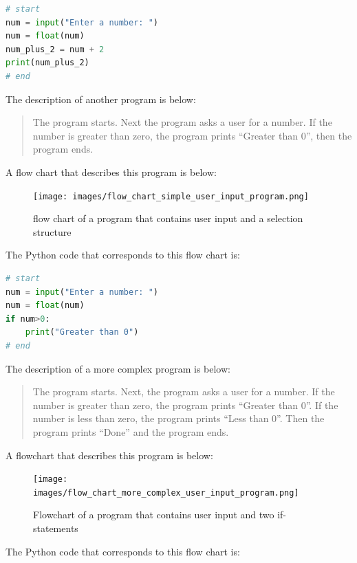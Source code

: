 \documentclass{book}
\begin{document}
\begin{lstlisting}[language=Python]
# start
num = input("Enter a number: ")
num = float(num)
num_plus_2 = num + 2
print(num_plus_2)
# end
\end{lstlisting}
    




    
        The description of another program is below:

\begin{quote}
The program starts. Next the program asks a user for a number. If the
number is greater than zero, the program prints ``Greater than 0'', then
the program ends.
\end{quote}

A flow chart that describes this program is below:

\begin{figure}
\centering
\texttt{[image: images/flow\_chart\_simple\_user\_input\_program.png]}
\caption{flow chart of a program that contains user input and a
selection structure}
\end{figure}

The Python code that corresponds to this flow chart is:

\begin{lstlisting}[language=Python]
# start
num = input("Enter a number: ")
num = float(num)
if num>0:
    print("Greater than 0")
# end
\end{lstlisting}
    




    
        The description of a more complex program is below:

\begin{quote}
The program starts. Next, the program asks a user for a number. If the
number is greater than zero, the program prints ``Greater than 0''. If
the number is less than zero, the program prints ``Less than 0''. Then
the program prints ``Done'' and the program ends.
\end{quote}

A flowchart that describes this program is below:

\begin{figure}
\centering
\texttt{[image: images/flow\_chart\_more\_complex\_user\_input\_program.png]}
\caption{Flowchart of a program that contains user input and two
if-statements}
\end{figure}

The Python code that corresponds to this flow chart is:
\end{document}
